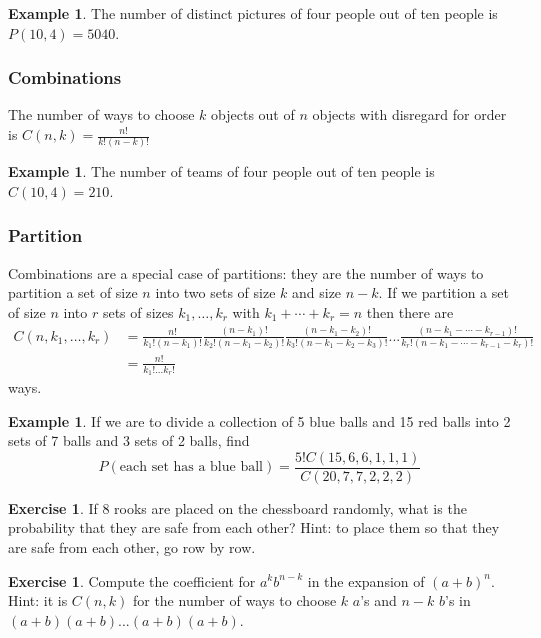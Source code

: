 \documentclass[12pt]{amsart}
\theoremstyle{definition}
\newtheorem{example}[theorem]{Example}
\newtheorem{exercise}[theorem]{Exercise}
\begin{document}
\begin{example} The number of distinct pictures of four people out of ten people is $P(10,4) = 5040$.
\end{example}

\subsubsection{Combinations} The number of ways to choose $k$ objects out of $n$ objects with disregard for order is $C(n, k) = \frac{n!}{k!(n-k)!}$

\begin{example} The number of teams of four people out of ten people is $C(10, 4) = 210$.
\end{example}

\subsubsection{Partition} Combinations are a special case of partitions: they are the number of ways to partition a set of size $n$ into two sets of size $k$ and size $n-k$. If we partition a set of size $n$ into $r$ sets of sizes $k_1, \dots , k_r$ with $k_1 + \cdots + k_r = n$ then there are
\begin{align*}
C(n, k_1, \dots ,k_r) & = \frac{n!}{k_1!(n - k_1)!}\frac{(n - k_1)!}{k_2!(n - k_1 - k_2)!}\frac{(n - k_1 - k_2)!}{k_3!(n - k_1 - k_2 - k_3)!}...\frac{(n - k_1 - \cdots - k_{r-1})!}{k_r!(n - k_1 - \cdots - k_{r-1} - k_r)!} \\
 & = \frac{n!}{k_1!...k_r!}
\end{align*}
ways.

\begin{example} If we are to divide a collection of 5 blue balls and 15 red balls into 2 sets of 7 balls and 3 sets of 2 balls, find
$$P(\text{each set has a blue ball}) = \frac{5! C(15,6,6,1,1,1)}{C(20,7,7,2,2,2)}$$
\end{example}

\begin{exercise} If 8 rooks are placed on the chessboard randomly, what is the probability that they are safe from  each other? Hint: to place them so that they are safe from each other, go row by row.
\end{exercise}

\begin{exercise} Compute the coefficient for $a^kb^{n-k}$ in the expansion of $(a+b)^n$. Hint: it is $C(n, k)$ for the number of ways to choose $k$ $a$'s and $n-k$ $b$'s in $(a + b)(a+b)...(a+b)(a+b)$.
\end{exercise}
\end{document}
